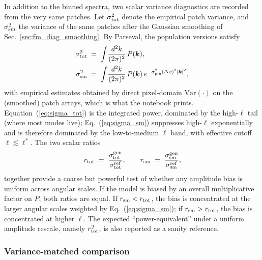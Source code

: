 \documentclass[11pt]{article}
\newcommand{\Var}{\mathrm{Var}}
\theoremstyle{definition}
\begin{document}
In addition to the binned spectra, two scalar variance diagnostics are recorded from the very same patches. Let $\sigma_{\rm tot}^2$ denote the empirical patch variance, and $\sigma_{\rm sm}^2$ the variance of the same patches after the Gaussian smoothing of Sec.~\ref{sec:fm_diag_smoothing}. By Parseval, the population versions satisfy
\begin{align}
  \sigma_{\rm tot}^2 \;&=\; \int\!\frac{d^2k}{(2\pi)^2}\,P(\bm k), \label{eq:sigma_tot}\\
  \sigma_{\rm sm}^2 \;&=\; \int\!\frac{d^2k}{(2\pi)^2}\,P(\bm k)\,
    e^{-\sigma_{\rm pix}^2(\Delta x)^2|\bm k|^2}, \label{eq:sigma_sm}
\end{align}
with empirical estimates obtained by direct pixel-domain $\Var(\cdot)$ on the (smoothed) patch arrays, which is what the notebook prints. Equation~(\ref{eq:sigma_tot}) is the integrated power, dominated by the high-$\ell$ tail (where most modes live); Eq.~(\ref{eq:sigma_sm}) suppresses high-$\ell$ exponentially and is therefore dominated by the low-to-medium $\ell$ band, with effective cutoff $\ell\!\lesssim\!\ell^*$. The two scalar ratios
\begin{equation}
  r_{\rm tot}\;=\;\frac{\sigma^{\rm gen}_{\rm tot}}{\sigma^{\rm ref}_{\rm tot}},\qquad
  r_{\rm sm}\;=\;\frac{\sigma^{\rm gen}_{\rm sm}}{\sigma^{\rm ref}_{\rm sm}},
  \label{eq:variance_ratios}
\end{equation}
together provide a coarse but powerful test of whether any amplitude bias is uniform across angular scales. If the model is biased by an overall multiplicative factor on $P$, both ratios are equal. If $r_{\rm sm}<r_{\rm tot}$, the bias is concentrated at the larger angular scales weighted by Eq.~(\ref{eq:sigma_sm}); if $r_{\rm sm}>r_{\rm tot}$, the bias is concentrated at higher $\ell$. The expected ``power-equivalent'' under a uniform amplitude rescale, namely $r_{\rm tot}^2$, is also reported as a sanity reference.

\subsubsection{Variance-matched comparison}
\label{sec:fm_diag_vm}
\end{document}
